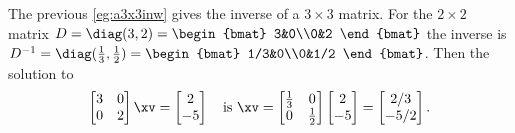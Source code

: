 \begin{example} 
The previous \cref{eg:a3x3inw} gives the inverse of a \(3\times3\) matrix.  
For the \(2\times2\) matrix \(D=\diag(3,2)=\begin{bmat} 3&0\\0&2 \end{bmat}\) the inverse is \(D^{-1}=\diag(\frac13,\frac12)=\begin{bmat} 1/3&0\\0&1/2 \end{bmat}\).  Then the solution to
\begin{equation*}
\begin{bmatrix} 3&0\\0&2 \end{bmatrix}\xv
=\begin{bmatrix} 2\\-5 \end{bmatrix}
\quad\text{is }\xv=\begin{bmatrix} \frac13&0\\0&\frac12 \end{bmatrix}
\begin{bmatrix} 2\\-5 \end{bmatrix}=\begin{bmatrix} 2/3\\-5/2 \end{bmatrix}.
\end{equation*}
\end{example}


